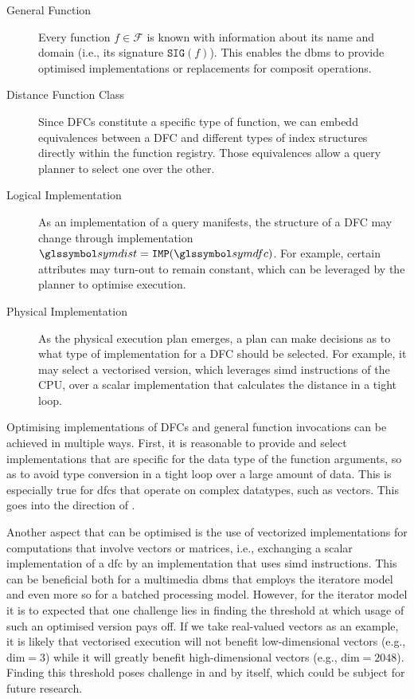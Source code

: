 \begin{description}
    \item[General Function] Every function $f \in \mathcal{F}$ is known with information about its name and domain (i.e., its signature $\mathtt{SIG}(f)$). This enables the \acrshort{dbms} to provide optimised implementations or replacements for composit operations.
    \item[Distance Function Class] Since DFCs constitute a specific type of function, we can embedd equivalences between a DFC and different types of index structures directly within the function registry. Those equivalences allow a query planner to select one over the other.
    \item[Logical Implementation] As an implementation of a query manifests, the structure of a DFC may change through implementation $\symdist = \mathtt{IMP}(\symdfc)$. For example, certain attributes may turn-out to remain constant, which can be leveraged by the planner to optimise execution.
    \item[Physical Implementation] As the physical execution plan emerges, a plan can make decisions as to what type of implementation for a DFC should be selected. For example, it may select a vectorised version, which leverages \acrshort{simd} instructions of the CPU, over a scalar implementation that calculates the distance in a tight loop.
\end{description}

Optimising implementations of DFCs and general function invocations can be achieved in multiple ways. First, it is reasonable to provide and select implementations that are specific for the data type of the function arguments, so as to avoid type conversion in a tight loop over a large amount of data. This is especially true for \acrshort{dfc}s that operate on complex datatypes, such as vectors. This goes into the direction of . 

Another aspect that can be optimised is the use of vectorized implementations for computations that involve vectors or matrices, i.e., exchanging a scalar implementation of a \acrshort{dfc} by an implementation that uses \acrshort{simd} instructions. This can be beneficial both for a multimedia \acrshort{dbms} that employs the iteratore model and even more so for a batched processing model. However, for the iterator model it is to expected that one challenge lies in finding the threshold at which usage of such an optimised version pays off. If we take real-valued vectors as an example, it is likely that vectorised execution will not benefit low-dimensional vectors (e.g., $\text{dim} = 3$) while it will greatly benefit high-dimensional vectors (e.g., $\text{dim} = 2048$). Finding this threshold poses challenge in and by itself, which could be subject for future research.


